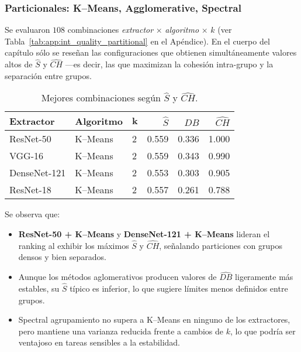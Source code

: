 \subsubsection{Particionales: K–Means, Agglomerative, Spectral}

\label{ssec:int_quality_partitional}

Se evaluaron \(108\) combinaciones
\textit{extractor} × \textit{algoritmo} × \(k\) (ver
Tabla~\ref{tab:app:int_quality_partitional} en el Apéndice).
En el cuerpo del capítulo sólo se reseñan las configuraciones que
obtienen simultáneamente valores altos de \(\widehat S\) y
\(\widehat{CH}\) —es decir, las que maximizan la cohesión intra-grupo
y la separación entre grupos.

\begin{table}[ht]
  \centering
  \caption{Mejores combinaciones según \(\widehat S\) y \(\widehat{CH}\).}
  \label{tab:int_quality_top}
  \begin{tabular}{lllrrr}
    \hline
    \textbf{Extractor} & \textbf{Algoritmo} & \(\mathbf{k}\)
      & \(\widehat S\) & \(\widehat{DB}\) & \(\widehat{CH}\) \\
    \hline
    ResNet-50    & K–Means & 2 & 0.559 & 0.336 & 1.000 \\
    VGG-16       & K–Means & 2 & 0.559 & 0.343 & 0.990 \\
    DenseNet-121 & K–Means & 2 & 0.553 & 0.303 & 0.905 \\
    ResNet-18    & K–Means & 2 & 0.557 & 0.261 & 0.788 \\
    \hline
  \end{tabular}
\end{table}

Se observa que:

\begin{itemize}
  \item \textbf{ResNet-50 + K–Means} y \textbf{DenseNet-121 + K–Means}
        lideran el ranking al exhibir los máximos
        \(\widehat S\) y \(\widehat{CH}\), señalando particiones con
        grupos densos y bien separados.
  \item Aunque los métodos aglomerativos producen valores de
        \(\widehat{DB}\) ligeramente más estables,
        su \(\widehat S\) típico es inferior,
        lo que sugiere límites menos definidos entre grupos.
  \item Spectral agrupamiento no supera a K–Means en ninguno de los
        extractores, pero mantiene una varianza reducida frente a cambios
        de \(k\), lo que podría ser ventajoso en tareas sensibles a la
        estabilidad.
\end{itemize}

